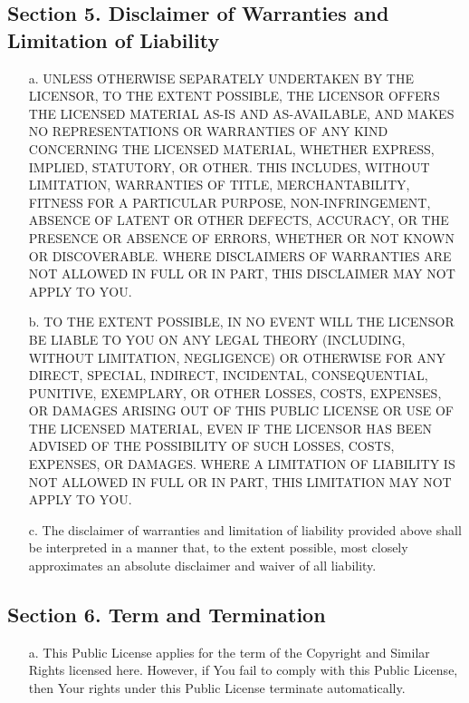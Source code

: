 \begin{scriptsize}
\subsection*{Section 5. Disclaimer of Warranties and Limitation of Liability}

\begin{itemize}
\item[a.] UNLESS OTHERWISE SEPARATELY UNDERTAKEN BY THE LICENSOR, TO THE
     EXTENT POSSIBLE, THE LICENSOR OFFERS THE LICENSED MATERIAL AS-IS
     AND AS-AVAILABLE, AND MAKES NO REPRESENTATIONS OR WARRANTIES OF
     ANY KIND CONCERNING THE LICENSED MATERIAL, WHETHER EXPRESS,
     IMPLIED, STATUTORY, OR OTHER. THIS INCLUDES, WITHOUT LIMITATION,
     WARRANTIES OF TITLE, MERCHANTABILITY, FITNESS FOR A PARTICULAR
     PURPOSE, NON-INFRINGEMENT, ABSENCE OF LATENT OR OTHER DEFECTS,
     ACCURACY, OR THE PRESENCE OR ABSENCE OF ERRORS, WHETHER OR NOT
     KNOWN OR DISCOVERABLE. WHERE DISCLAIMERS OF WARRANTIES ARE NOT
     ALLOWED IN FULL OR IN PART, THIS DISCLAIMER MAY NOT APPLY TO YOU.

  \item[b.] TO THE EXTENT POSSIBLE, IN NO EVENT WILL THE LICENSOR BE LIABLE
     TO YOU ON ANY LEGAL THEORY (INCLUDING, WITHOUT LIMITATION,
     NEGLIGENCE) OR OTHERWISE FOR ANY DIRECT, SPECIAL, INDIRECT,
     INCIDENTAL, CONSEQUENTIAL, PUNITIVE, EXEMPLARY, OR OTHER LOSSES,
     COSTS, EXPENSES, OR DAMAGES ARISING OUT OF THIS PUBLIC LICENSE OR
     USE OF THE LICENSED MATERIAL, EVEN IF THE LICENSOR HAS BEEN
     ADVISED OF THE POSSIBILITY OF SUCH LOSSES, COSTS, EXPENSES, OR
     DAMAGES. WHERE A LIMITATION OF LIABILITY IS NOT ALLOWED IN FULL OR
     IN PART, THIS LIMITATION MAY NOT APPLY TO YOU.

  \item[c.] The disclaimer of warranties and limitation of liability provided
     above shall be interpreted in a manner that, to the extent
     possible, most closely approximates an absolute disclaimer and
     waiver of all liability.
\end{itemize}


\subsection*{Section 6. Term and Termination}

\begin{itemize}
\item[a.] This Public License applies for the term of the Copyright and
     Similar Rights licensed here. However, if You fail to comply with
     this Public License, then Your rights under this Public License
     terminate automatically.


\end{itemize}
\end{scriptsize}
